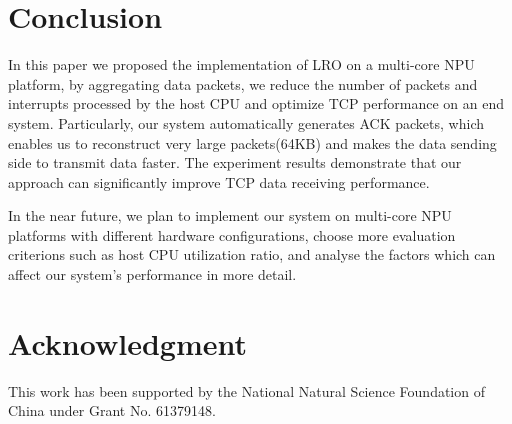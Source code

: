 \documentclass[conference]{IEEEtran}
\begin{document}




\section{Conclusion}
In this paper we proposed the implementation of LRO on a multi-core NPU platform, by aggregating data packets, we reduce the number of packets and interrupts processed by the host CPU and optimize TCP performance on an end system. Particularly, our system automatically generates ACK packets, which enables us to reconstruct very large packets(64KB) and makes the data sending side to transmit data faster. The experiment results demonstrate that our approach can significantly improve TCP data receiving performance.

In the near future, we plan to implement our system on multi-core NPU platforms with different hardware configurations, choose more evaluation criterions such as host CPU utilization ratio, and analyse the factors which can affect our system's performance in more detail.


\section*{Acknowledgment}
This work has been supported by the National Natural Science Foundation of China under Grant No. 61379148.








%






\end{document}
